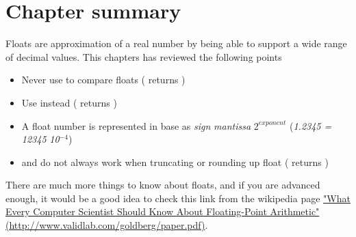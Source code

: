 \documentclass[a4paper,10pt,twoside]{book}
\begin{document}
\section{Chapter summary}

Floats are approximation of a real number by being able to support a wide range of decimal values. This chapters has reviewed the following points

\begin{itemize}
\item Never use \ct{=} to compare floats (\eg {} returns )
\item Use  instead (\eg {} returns )
\item A float number is represented in base as \emph{sign}  \emph{mantissa}  $2^{exponent}$ (\eg \emph{1.2345 = 12345}  \emph{10}$^{-4}$)
\item {} and  do not always work when truncating or rounding up float (\eg {} returns )
\end{itemize}


There are much more things to know about floats, and if you are advanced enough, it would be a good idea to check this link from the wikipedia page \href{http://www.validlab.com/goldberg/paper.pdf}{"What Every Computer Scientist Should Know About Floating-Point Arithmetic" (http://www.validlab.com/goldberg/paper.pdf)}.


\ifx\wholebook\relax\else
   
   
\end{document}
